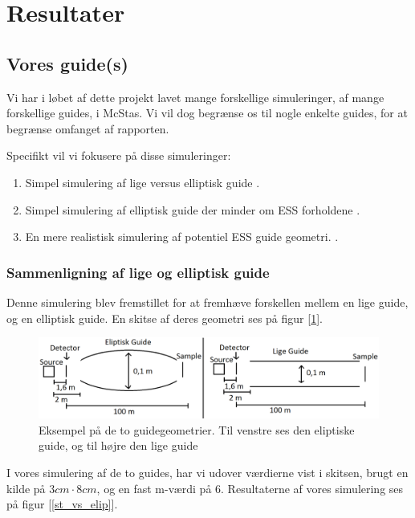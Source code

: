 \documentclass[12pt,oneside,a4paper]{article}
\begin{document}
{{{{{\section{Resultater}

\subsection{Vores guide(s)}
Vi har i løbet af dette projekt lavet mange forskellige simuleringer, af mange forskellige guides, i McStas. Vi vil dog begrænse os til nogle enkelte guides, for at begrænse omfanget af rapporten.

Specifikt vil vi fokusere på disse simuleringer:
\begin{enumerate}
    \item Simpel simulering af lige versus elliptisk guide \cite{github:st_vs_el}.
    \item Simpel simulering af elliptisk guide der minder om ESS forholdene \cite{github:ess_sim_simple}.
    \item En mere realistisk simulering af potentiel ESS guide geometri. \cite{github:ess_brill_optimized}.
\end{enumerate}

\subsubsection{Sammenligning af lige og elliptisk guide}
Denne simulering blev fremstillet for at fremhæve forskellen mellem en lige guide, og en elliptisk guide. En skitse af deres geometri ses på figur [\ref{lige_mod_eliptisk}].

\begin{figure}[H] 
\centering
\includegraphics[width=1\textwidth]{Straight_VS_Elipse.png}
\caption{Eksempel på de to guidegeometrier. Til venstre ses den eliptiske guide, og til højre den lige guide} \label{lige_mod_eliptisk}
\end{figure}

I vores simulering af de to guides, har vi udover værdierne vist i skitsen, brugt en kilde på $3cm\cdot8cm$, og en fast m-værdi på 6. Resultaterne af vores simulering ses på figur [\ref{st_vs_elip}].

}}}}}
\end{document}
